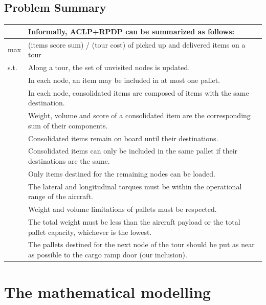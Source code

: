 \documentclass[preprint,authoryear]{elsarticle}
\begin{document}
\subsection{Problem Summary}


\bgroup
\def\arraystretch{1.2}
\begin{table}[H]
	\centering
	\small
	\begin{tabular}{MT}
		&Informally, ACLP+RPDP can be summarized as follows:\\
		\midrule
		max &  (items score sum) / (tour cost) of picked up and delivered items on a tour  \\
		\midrule
s.t.    & Along a tour, the set of unvisited nodes is updated. \\
		& In each node, an item may be included in at most one pallet.\\		
		& In each node, consolidated items are composed of items with the same destination. \\
		& Weight, volume and score of a consolidated item are the corresponding sum of their components.\\
		& Consolidated items remain on board until their destinations.\\	
		& Consolidated items can only be included in the same pallet if their destinations are the same.\\
		& Only items destined for the remaining nodes can be loaded.  \\
		& The lateral and longitudinal torques must be within the operational range of the aircraft.\\
		& Weight and volume limitations of pallets must be respected.\\
		& The total weight must be less than the aircraft payload or the total pallet capacity, whichever is the lowest.\\	
		& The pallets destined for the next node of the tour should be put as near as possible to the cargo ramp door (our inclusion).\\		
		\midrule
	\end{tabular}
	\normalsize
\end{table}
\egroup 


\section{The mathematical modelling}
\label{sec4}
\end{document}
